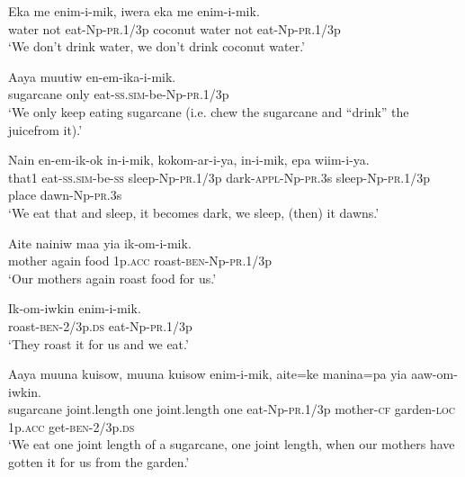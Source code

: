 \ea\label{ex:a:x5}
\gll  Eka  me  enim-i-mik,  iwera  eka  me  enim-i-mik. \\
water  not  eat-Np-\textsc{pr}.1/3p  coconut  water  not  eat-Np-\textsc{pr}.1/3p \\
\glt ‘We don’t drink water, we don’t drink coconut water.’ \\
\z


\ea\label{ex:a:x6}
\gll  Aaya  muutiw  en-em-ika-i-mik. \\
sugarcane  only  eat-\textsc{ss}.\textsc{sim}-be-Np-\textsc{pr}.1/3p \\
\glt ‘We only keep eating sugarcane (i.e. chew the sugarcane and “drink” the juicefrom it).’ \\
\z


\ea\label{ex:a:x7}
\gll  Nain  en-em-ik-ok  in-i-mik,  kokom-ar-i-ya,            in-i-mik,  epa  wiim-i-ya. \\
that1  eat-\textsc{ss}.\textsc{sim}-be-\textsc{ss}  sleep-Np-\textsc{pr}.1/3p  dark-\textsc{appl}-Np-\textsc{pr}.3s sleep-Np-\textsc{pr}.1/3p  place  dawn-Np-\textsc{pr}.3s \\


\glt ‘We eat that and sleep, it becomes dark, we sleep, (then) it dawns.’ \\
\z


\ea\label{ex:a:x8}
\gll  Aite  nainiw  maa  yia  ik-om-i-mik. \\
mother  again  food  1p.\textsc{acc}  roast-\textsc{ben}-Np-\textsc{pr}.1/3p \\
\glt ‘Our mothers again roast food for us.’ \\
\z


\ea\label{ex:a:x9}
\gll  Ik-om-iwkin  enim-i-mik. \\
roast-\textsc{ben}-2/3p.\textsc{ds}  eat-Np-\textsc{pr}.1/3p \\
\glt ‘They roast it for us and we eat.’ \\
\z


\ea\label{ex:a:x10}
\gll  Aaya  muuna  kuisow,  muuna  kuisow  enim-i-mik,  aite=ke             manina=pa  yia  aaw-om-iwkin. \\
sugarcane  joint.length  one  joint.length  one  eat-Np-\textsc{pr}.1/3p  mother-\textsc{cf}  garden-\textsc{loc}  1p.\textsc{acc}  get-\textsc{ben}-2/3p.\textsc{ds} \\


\glt ‘We eat one joint length of a sugarcane, one joint length, when our mothers have gotten it for us from the garden.’ \\
\z


